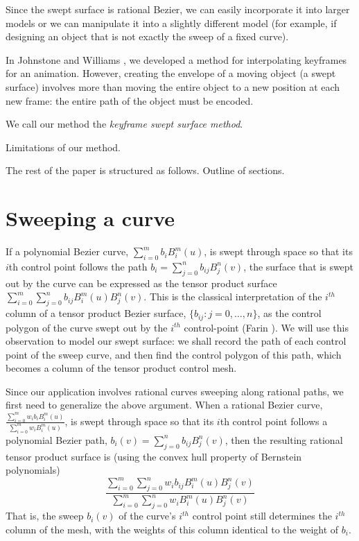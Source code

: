 Since the swept surface is rational Bezier, 
we can easily incorporate it into larger models
or we can manipulate it into a slightly different model
(for example, if designing an object that is not exactly the sweep
of a fixed curve).

In Johnstone and Williams \cite{jjjimbo94a}, 
we developed a method for interpolating keyframes
for an animation.
However, creating the envelope of a moving object (a swept surface)
involves more than moving the entire object to a new position
at each new frame: the entire path of the object must be encoded.

We call our method the {\em keyframe swept surface method}.

Limitations of our method.

The rest of the paper is structured as follows.
Outline of sections.

\section{Sweeping a curve}

If a polynomial Bezier curve, $\sum_{i=0}^{m} b_i B_{i}^{m}(u)$,
is swept through space so that its $i$th control point follows the path 
$b_i = \sum_{j=0}^{n} b_{ij} B_{j}^{n}(v)$,
the surface that is swept out by the curve
can be expressed as the tensor product surface 
$\sum_{i=0}^{m} \sum_{j=0}^{n} b_{ij} B_{i}^{m}(u) B_{j}^{n}(v)$.
This is the classical interpretation of the $i^{th}$ column of a tensor
product Bezier surface, $\{b_{ij}: j=0,\ldots,n\}$, 
as the control polygon of the curve swept out by the $i^{th}$ control-point
(Farin \cite{farin93}).
We will use this observation to model our swept surface:
we shall record the path of each control point of the
sweep curve, and then find the control polygon
of this path, which becomes a column of the tensor product control mesh.

Since our application involves rational curves sweeping along rational paths,
we first need to generalize the above argument.
When a rational Bezier curve,
$\frac{\sum_{i=0}^{m} w_i b_i B_i^{m}(u)}{\sum_{i=0}^{m} w_i B_i^{m}(u)}$,
is swept through space so that its $i$th control point follows
a polynomial Bezier path, 
$b_{i}(v) = \sum_{j=0}^{n} b_{ij} B_{j}^{n}(v)$,
then the resulting rational tensor product surface is
(using the convex hull property of Bernstein polynomials)
\[
\frac{\sum_{i=0}^{m} \sum_{j=0}^n w_i b_{ij} B_i^{m}(u) B_j^n(v)}
{\sum_{i=0}^{m} \sum_{j=0}^n  w_i B_i^{m}(u) B_j^n(v)}
\]
That is, the sweep $b_{i}(v)$ of the curve's $i^{th}$ control point still
determines the $i^{th}$ column of the mesh,
with the weights of this column identical to the weight of $b_i$.

